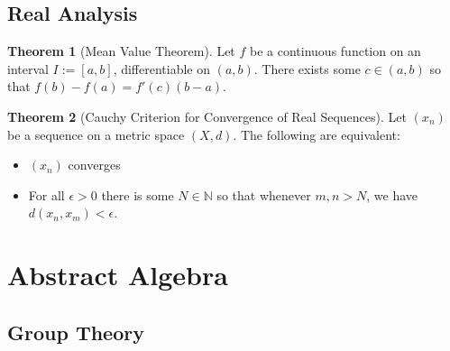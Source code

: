 \documentclass{article}
\theoremstyle{definition}
\newtheorem{theorem}{Theorem}[subsection]
\begin{document}
    \subsection{Real Analysis}
    \begin{theorem}[Mean Value Theorem]
        Let $f$ be a continuous function on an interval $I:=[a,b]$, differentiable on $(a,b)$. There exists some $c\in(a,b)$ so that $f(b)-f(a)=f'(c)(b-a)$.
    \end{theorem}
    \begin{theorem}[Cauchy Criterion for Convergence of Real Sequences]
        Let $(x_n)$ be a sequence on a metric space $(X,d)$. The following are equivalent:
        \begin{itemize}
            \item $(x_n)$ converges
            \item For all $\epsilon> 0$ there is some $N\in\mathbb{N}$ so that whenever $m,n>N$, we have $d(x_n,x_m)<\epsilon$.
        \end{itemize}
    \end{theorem}

\section{Abstract Algebra}

\setcounter{subsection}{-1}
\subsection{Group Theory}
\end{document}
